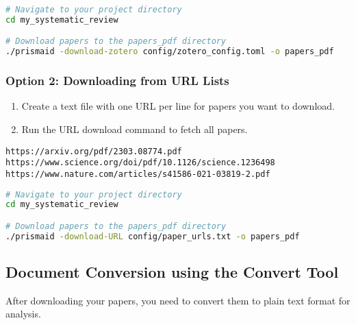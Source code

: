 \begin{commandbox}
\begin{lstlisting}[language=Bash]
# Navigate to your project directory
cd my_systematic_review

# Download papers to the papers_pdf directory
./prismaid -download-zotero config/zotero_config.toml -o papers_pdf
\end{lstlisting}
\end{commandbox}

\subsubsection{Option 2: Downloading from URL Lists}
\begin{enumerate}
    \item Create a text file with one URL per line for papers you want to download.
    \item Run the URL download command to fetch all papers.
\end{enumerate}

\begin{infobox}
\begin{lstlisting}
https://arxiv.org/pdf/2303.08774.pdf
https://www.science.org/doi/pdf/10.1126/science.1236498
https://www.nature.com/articles/s41586-021-03819-2.pdf
\end{lstlisting}
\end{infobox}

\begin{commandbox}
\begin{lstlisting}[language=Bash]
# Navigate to your project directory
cd my_systematic_review

# Download papers to the papers_pdf directory
./prismaid -download-URL config/paper_urls.txt -o papers_pdf
\end{lstlisting}
\end{commandbox}



\subsection{Document Conversion using the Convert Tool}

After downloading your papers, you need to convert them to plain text format for analysis.

